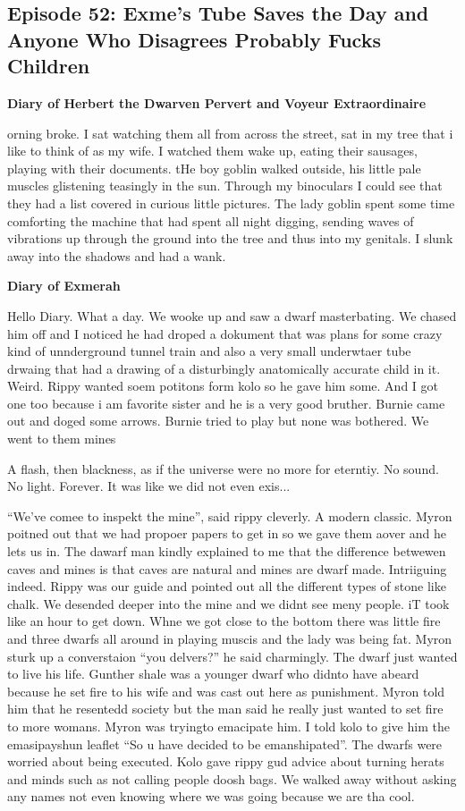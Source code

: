\subsection{Episode 52: Exme's Tube Saves the Day and Anyone Who Disagrees Probably Fucks Children}

\textbf{Diary of Herbert the Dwarven Pervert and Voyeur Extraordinaire}\medskip

orning broke. I sat watching them all from across the street, sat in my tree that i like to think of as my wife. I watched them wake up, eating their sausages, playing with their documents. tHe boy goblin walked outside, his little pale muscles glistening teasingly in the sun. Through my binoculars I could see that they had a list covered in curious little pictures. The lady goblin spent some time comforting the machine that had spent all night digging, sending waves of vibrations up through the ground into the tree and thus into my genitals. I slunk away into the shadows and had a wank.\medskip

\textbf{Diary of Exmerah}\medskip

Hello Diary. What a day. We wooke up and saw a dwarf masterbating. We chased him off and I noticed he had droped a dokument that was plans for some crazy kind of unnderground tunnel train and also a very small underwtaer tube drwaing that had a drawing of a disturbingly anatomically accurate child in it. Weird. Rippy wanted soem potitons form kolo so he gave him some. And I got one too because i am favorite sister and he is a very good bruther. Burnie came out and doged some arrows. Burnie tried to play but none was bothered. We went to them mines\medskip

A flash, then blackness, as if the universe were no more for eterntiy. No sound. No light. Forever. It was like we did not even exis...\medskip

“We’ve comee to inspekt the mine”, said rippy cleverly. A modern classic. Myron poitned out that we had propoer papers to get in so we gave them aover and he lets us in. The dawarf man kindly explained to me that the difference betwewen caves and mines is that caves are natural and mines are dwarf made. Intriiguing indeed. Rippy was our guide and pointed out all the different types of stone like chalk. We desended deeper into the mine and we didnt see meny people. iT took like an hour to get down. Whne we got close to the bottom there was little fire and three dwarfs all around in playing muscis and the lady was being fat. Myron sturk up a converstaion “you delvers?” he said charmingly. The dwarf just wanted to live his life. Gunther shale was a younger dwarf who didnto have abeard because he set fire to his wife and was cast out here as punishment. Myron told him that he resentedd society but the man said he really just wanted to set fire to more womans. Myron was tryingto emacipate him. I told kolo to give him the emasipayshun leaflet “So u have decided to be emanshipated”. The dwarfs were worried about being executed. Kolo gave rippy gud advice about turning herats and minds such as not calling people doosh bags. We walked away without asking any names not even knowing where we was going because we are tha cool.\medskip

